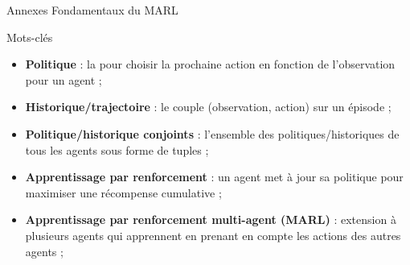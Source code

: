 \begin{frame}[allowframebreaks]{Annexes} {Fondamentaux du MARL}

    \begin{block}{Mots-clés}
        \begin{itemize}
            \item \textbf{Politique} : la  pour choisir la prochaine action en fonction de l'observation pour un agent ;
            \item \textbf{Historique/trajectoire} : le couple (observation, action) sur un épisode ;
            \item \textbf{Politique/historique conjoints} : l'ensemble des politiques/historiques de tous les agents sous forme de tuples ;
            \item \textbf{Apprentissage par renforcement} : un agent met à jour sa politique pour maximiser une récompense cumulative ;
            \item \textbf{Apprentissage par renforcement multi-agent (MARL)} : extension à plusieurs agents qui apprennent en prenant en compte les actions des autres agents ;
        \end{itemize}
    \end{block}
    
\end{frame}

